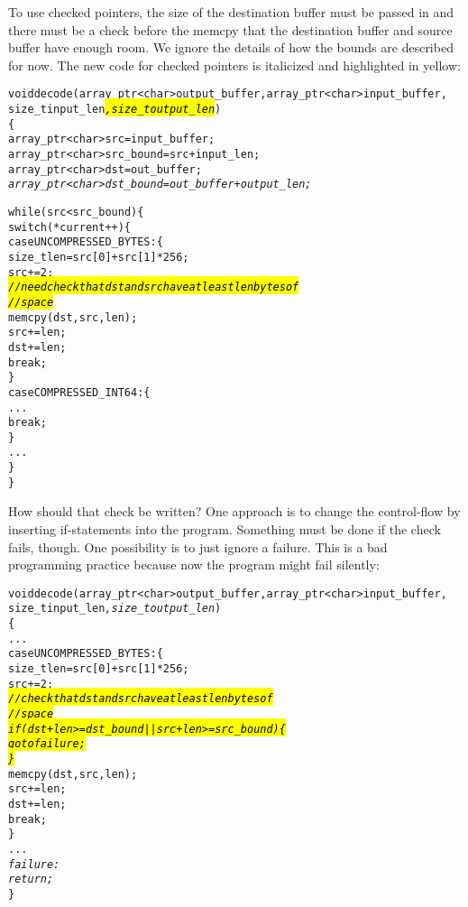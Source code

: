 To use checked pointers, the size of the destination buffer must be passed
in and there must be a check before the memcpy that the destination
buffer and source buffer have enough room. We ignore the details of how
the bounds are described for now.    The new code for checked pointers is italicized
and highlighted in yellow:

\begin{alltt}
void decode(array\_ptr<char> output\_buffer, array\_ptr<char> input\_buffer, 
            size\_t input_len\hl{\textit{, size\_t output_len}})
\{
    array\_ptr<char> src = input\_buffer;
    array\_ptr<char> src\_bound = src + input\_len;
    array\_ptr<char> dst = out\_buffer;
    \textit{array\_ptr<char> dst\_bound = out\_buffer + output\_len;}


    while (src < src\_bound) \{
        switch (*current++) \{
            case UNCOMPRESSED\_BYTES: \{ 
                size\_t len = src[0] + src[1]*256;
                src += 2;
                \hl{\textit{// need check that dst and src have at least len bytes of}}
                \hl{\textit{// space}}
                memcpy(dst, src, len);
                src += len;
                dst += len;                
                break;
            \}
            case COMPRESSED\_INT64: \{
                ...
                break;
            \}
        ...
    \}
\}
\end{alltt}

How should that check be written? One approach is to change the
control-flow by inserting if-statements into the program. Something must
be done if the check fails, though. One possibility is to just ignore a
failure. This is a bad programming practice because now the program might
fail silently:

\begin{alltt}
void decode(array\_ptr<char> output\_buffer, array\_ptr<char> input\_buffer, 
            size\_t input\_len\textit{, size\_t output\_len})
\{
      ...
            case UNCOMPRESSED\_BYTES: \{
                size\_t len = src[0] + src[1]*256;
                src += 2;
                \hl{\textit{// check that dst and src have at least len bytes of}}
                \hl{\textit{// space}}
                \hl{\textit{if (dst + len >= dst\_bound || src + len >= src\_bound) \{}}
                \hl{\textit{   goto failure;}}
                \hl{\textit{\}}}
                memcpy(dst, src, len);
                src += len;
                dst += len;                
                break;
            \}
   ...
   \textit{failure:}
   \textit{   return;}
\}
\end{alltt}

